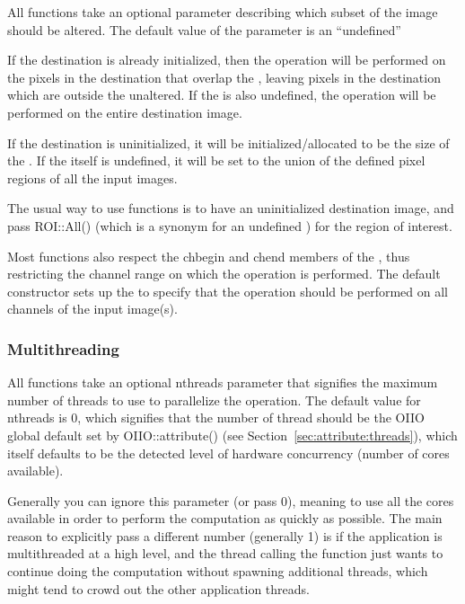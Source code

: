 All \IBA functions take an optional \ROI parameter describing which
subset of the image should be altered.  The default value of the \ROI
parameter is an ``undefined'' \ROI

If the destination \ImageBuf is already initialized, then the operation
will be performed on the pixels in the destination that overlap the
\ROI, leaving pixels in the destination which are outside the \ROI
unaltered.  If the \ROI is also undefined, the operation will be
performed on the entire destination image.

If the destination \ImageBuf is uninitialized, it will be
initialized/allocated to be the size of the \ROI.  If the \ROI itself is
undefined, it will be set to the union of the defined pixel regions of
all the input images.

The usual way to use \IBA functions is to have an uninitialized
destination image, and pass {\cf ROI::All()} (which is a synonym
for an undefined \ROI) for the region of interest.

Most \IBA functions also respect the {\cf chbegin} and {\cf chend}
members of the \ROI, thus restricting the channel range on which the
operation is performed.  The default \ROI constructor sets up the \ROI
to specify that the operation should be performed on all channels of
the input image(s).

\subsubsection*{Multithreading}

All \IBA functions take an optional {\cf nthreads} parameter that
signifies the maximum number of threads to use to parallelize the
operation.  The default value for {\cf nthreads} is 0, which signifies
that the number of thread should be the OIIO global default set by {\cf
  OIIO::attribute()} (see Section~\ref{sec:attribute:threads}), which
itself defaults to be the detected level of hardware concurrency (number
of cores available).

Generally you can ignore this parameter (or pass 0), meaning to use all
the cores available in order to perform the computation as quickly as
possible.  The main reason to explicitly pass a different number
(generally 1) is if the application is multithreaded at a high level,
and the thread calling the \IBA function just wants to continue doing
the computation without spawning additional threads, which might tend to
crowd out the other application threads.


